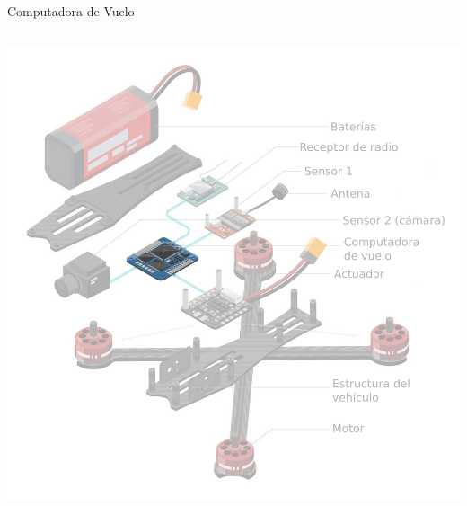 \begin{frame}{Computadora de Vuelo}
\begin{columns}
\begin{overprint}
				\includegraphics[width=\textwidth]{img/partes_de_un_drone_transparencia.png}
			\end{overprint}
	\end{columns}
\end{frame}

